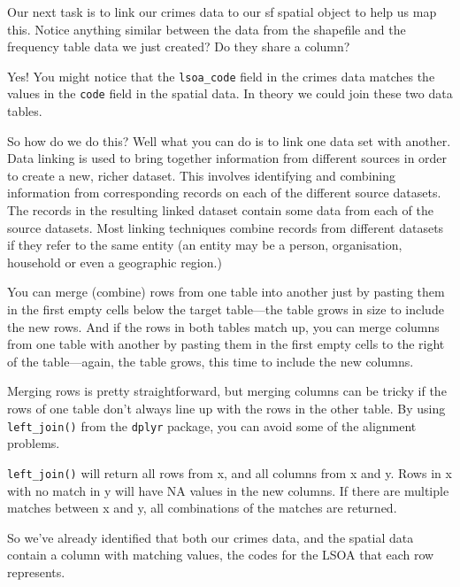 \documentclass[
]{book}
\begin{document}
Our next task is to link our crimes data to our sf spatial object to help us map this. Notice anything similar between the data from the shapefile and the frequency table data we just created? Do they share a column?

Yes! You might notice that the \texttt{lsoa\_code} field in the crimes data matches the values in the \texttt{code} field in the spatial data. In theory we could join these two data tables.

So how do we do this? Well what you can do is to link one data set with another. Data linking is used to bring together information from different sources in order to create a new, richer dataset. This involves identifying and combining information from corresponding records on each of the different source datasets. The records in the resulting linked dataset contain some data from each of the source datasets. Most linking techniques combine records from different datasets if they refer to the same entity (an entity may be a person, organisation, household or even a geographic region.)

You can merge (combine) rows from one table into another just by pasting them in the first empty cells below the target table---the table grows in size to include the new rows. And if the rows in both tables match up, you can merge columns from one table with another by pasting them in the first empty cells to the right of the table---again, the table grows, this time to include the new columns.

Merging rows is pretty straightforward, but merging columns can be tricky if the rows of one table don't always line up with the rows in the other table. By using \texttt{left\_join()} from the \texttt{dplyr} package, you can avoid some of the alignment problems.

\texttt{left\_join()} will return all rows from x, and all columns from x and y. Rows in x with no match in y will have NA values in the new columns. If there are multiple matches between x and y, all combinations of the matches are returned.

So we've already identified that both our crimes data, and the spatial data contain a column with matching values, the codes for the LSOA that each row represents.
\end{document}
